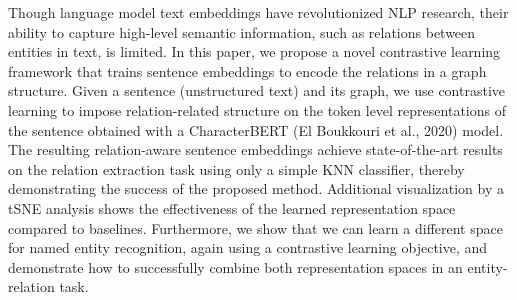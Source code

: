Though language model text embeddings have revolutionized NLP research, their ability to capture high-level semantic information, such as relations between entities in text, is limited. In this paper, we propose a novel contrastive learning framework that trains sentence embeddings to encode the relations in a graph structure. Given a sentence (unstructured text) and its graph, we use contrastive learning to impose relation-related structure on the token level representations of the sentence obtained with a CharacterBERT (El Boukkouri et al., 2020) model. The resulting relation-aware sentence embeddings achieve state-of-the-art results on the relation extraction task using only a simple KNN classifier, thereby demonstrating the success of the proposed method. Additional visualization by a tSNE analysis shows the effectiveness of the learned representation space compared to baselines. Furthermore, we show that we can learn a different space for named entity recognition, again using a contrastive learning objective, and demonstrate how to successfully combine both representation spaces in an entity-relation task.
